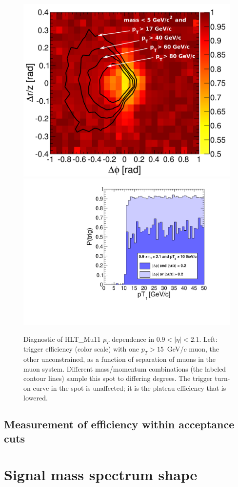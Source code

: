 \documentclass[12pt]{cms-tdr}
\begin{document}
\begin{figure}[p]
\includegraphics[width=0.48\linewidth]{PLOTS/endcap_dphidr_HLTMu11_09_21.pdf} \hfill
\includegraphics[width=0.48\linewidth]{PLOTS/trigger_turnonMu11.pdf}

\caption{Diagnostic of HLT\_Mu11 $p_T$ dependence in $0.9 < |\eta| <
  2.1$.  Left: trigger efficiency (color scale) with one $p_T >
  15$~GeV/$c$ muon, the other unconstrained, as a function of
  separation of muons in the muon system.  Different mass/momentum
  combinations (the labeled contour lines) sample this spot to
  differing degrees.  The trigger turn-on curve in the spot is
  unaffected; it is the plateau efficiency that is
  lowered. \label{fig:triggersimulation2}}
\end{figure}


\subsection{Measurement of efficiency within acceptance cuts}


\section{Signal mass spectrum shape}
\label{sec:signal_mass_spectrum_shape}
\end{document}
